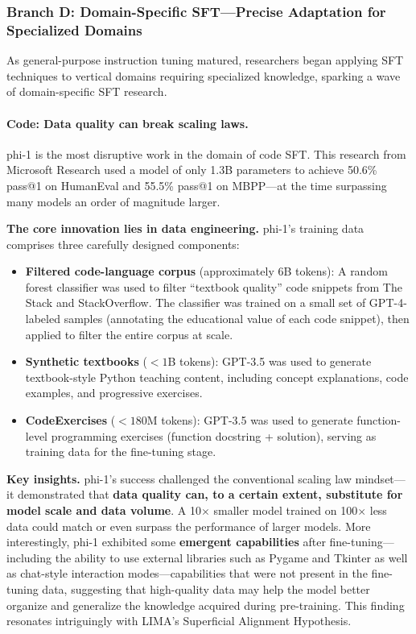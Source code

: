 \subsubsection{Branch D: Domain-Specific SFT---Precise Adaptation for Specialized Domains}
\label{sec:t1-domain}

As general-purpose instruction tuning matured, researchers began applying SFT techniques to
vertical domains requiring specialized knowledge, sparking a wave of domain-specific SFT research.

\paragraph{Code: Data quality can break scaling laws.}
phi-1 is the most disruptive work in the domain of code SFT.
This research from Microsoft Research used a model of only 1.3B parameters
to achieve 50.6\% pass@1 on HumanEval and 55.5\% pass@1 on MBPP---at
the time surpassing many models an order of magnitude larger.

\textbf{The core innovation lies in data engineering.}
phi-1's training data comprises three carefully designed components:
\begin{itemize}[leftmargin=1.5em]
  \item \textbf{Filtered code-language corpus} (approximately 6B tokens):
    A random forest classifier was used to filter ``textbook quality'' code snippets
    from The Stack and StackOverflow.
    The classifier was trained on a small set of GPT-4-labeled samples (annotating the educational value of each code snippet),
    then applied to filter the entire corpus at scale.

  \item \textbf{Synthetic textbooks} ($< 1$B tokens):
    GPT-3.5 was used to generate textbook-style Python teaching content,
    including concept explanations, code examples, and progressive exercises.

  \item \textbf{CodeExercises} ($< 180$M tokens):
    GPT-3.5 was used to generate function-level programming exercises (function docstring + solution),
    serving as training data for the fine-tuning stage.
\end{itemize}

\textbf{Key insights.}
phi-1's success challenged the conventional scaling law mindset---it
demonstrated that \textbf{data quality can, to a certain extent, substitute for model scale and data volume}.
A 10$\times$ smaller model trained on 100$\times$ less data
could match or even surpass the performance of larger models.
More interestingly, phi-1 exhibited some \textbf{emergent capabilities} after fine-tuning---including
the ability to use external libraries such as Pygame and Tkinter as well as chat-style interaction modes---capabilities
that were not present in the fine-tuning data, suggesting that high-quality data may help the model
better organize and generalize the knowledge acquired during pre-training.
This finding resonates intriguingly with LIMA's Superficial Alignment Hypothesis.

